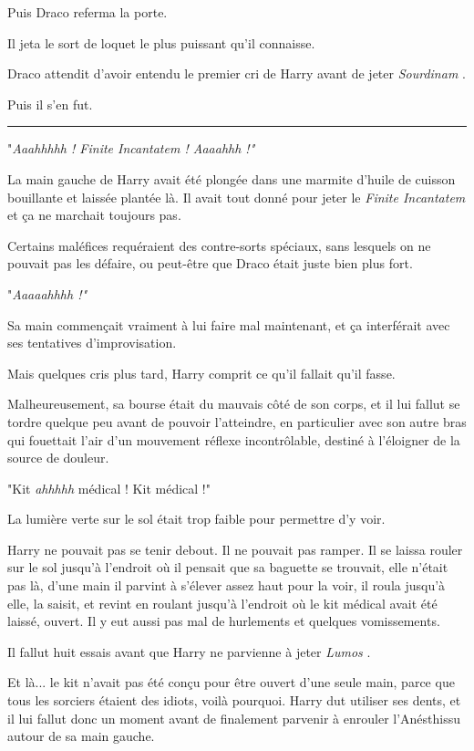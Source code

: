 Puis Draco referma la porte.

Il jeta le sort de loquet le plus puissant qu'il connaisse.

Draco attendit d'avoir entendu le premier cri de Harry avant de jeter \emph{Sourdinam} .

Puis il s'en fut.
\par\noindent\rule{\textwidth}{0.4pt}
"\emph{Aaahhhhh ! Finite Incantatem ! Aaaahhh !"} 

La main gauche de Harry avait été plongée dans une marmite d'huile de cuisson bouillante et laissée plantée là. Il avait tout donné pour jeter le \emph{Finite Incantatem}  et ça ne marchait toujours pas.

Certains maléfices requéraient des contre-sorts spéciaux, sans lesquels on ne pouvait pas les défaire, ou peut-être que Draco était juste bien plus fort.

"\emph{Aaaaahhhh !"} 

Sa main commençait vraiment à lui faire mal maintenant, et ça interférait avec ses tentatives d'improvisation.

Mais quelques cris plus tard, Harry comprit ce qu'il fallait qu'il fasse.

Malheureusement, sa bourse était du mauvais côté de son corps, et il lui fallut se tordre quelque peu avant de pouvoir l'atteindre, en particulier avec son autre bras qui fouettait l'air d'un mouvement réflexe incontrôlable, destiné à l'éloigner de la source de douleur.

"Kit \emph{ahhhhh}  médical ! Kit médical !"

La lumière verte sur le sol était trop faible pour permettre d'y voir.

Harry ne pouvait pas se tenir debout. Il ne pouvait pas ramper. Il se laissa rouler sur le sol jusqu'à l'endroit où il pensait que sa baguette se trouvait, elle n'était pas là, d'une main il parvint à s'élever assez haut pour la voir, il roula jusqu'à elle, la saisit, et revint en roulant jusqu'à l'endroit où le kit médical avait été laissé, ouvert. Il y eut aussi pas mal de hurlements et quelques vomissements.

Il fallut huit essais avant que Harry ne parvienne à jeter \emph{Lumos} .

Et là... le kit n'avait pas été conçu pour être ouvert d'une seule main, parce que tous les sorciers étaient des idiots, voilà pourquoi. Harry dut utiliser ses dents, et il lui fallut donc un moment avant de finalement parvenir à enrouler l'Anésthissu autour de sa main gauche.

